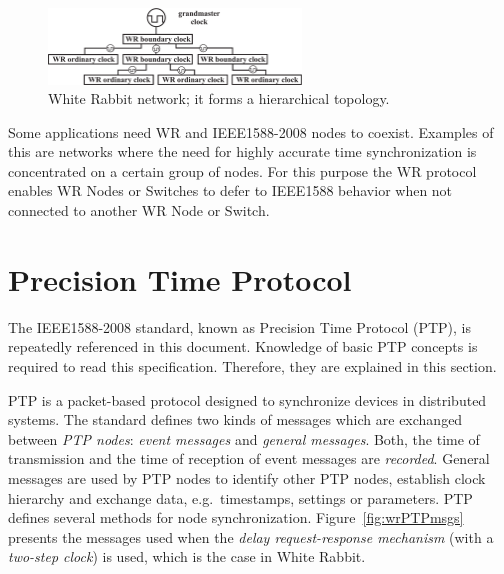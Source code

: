 \documentclass[a4paper, 12pt]{article}
\begin{document}
\begin{figure}[ht!]
  \centering
  \includegraphics[width=0.60\textwidth]{network/wrTopology.pdf}
  \caption{White Rabbit network; it forms a hierarchical topology.}
  \label{fig:wrNetwork}
\end{figure}

Some applications need WR and IEEE1588-2008 nodes to coexist. Examples
of this are networks where the need for highly accurate time synchronization is concentrated on a
certain group of nodes. For this purpose the WR protocol enables WR Nodes or Switches 
to defer to IEEE1588 behavior when not connected to another WR Node or Switch.




\newpage

\section{Precision Time Protocol}
\label{sec:ptp}

The IEEE1588-2008 standard, known as Precision Time Protocol (PTP), 
is repeatedly referenced in this document. Knowledge of basic PTP concepts is 
required to read this specification. Therefore, they are explained in this section. 

PTP is a packet-based protocol designed to synchronize devices in distributed systems. 
The standard defines two kinds of messages which are exchanged between \textit{PTP nodes}: 
\textit{event messages} and \textit{general messages}. Both, the time of transmission and 
the time of reception of event messages are \textit{recorded}. General messages 
are used by PTP nodes to identify other PTP nodes, establish clock hierarchy and 
exchange data, e.g.~timestamps, settings or parameters. PTP defines several methods 
for node synchronization. Figure~\ref{fig:wrPTPmsgs} presents the messages used when 
the \textit{delay request-response mechanism} (with a \textit{two-step clock}) is used, 
which is the case in White Rabbit. 
\end{document}
